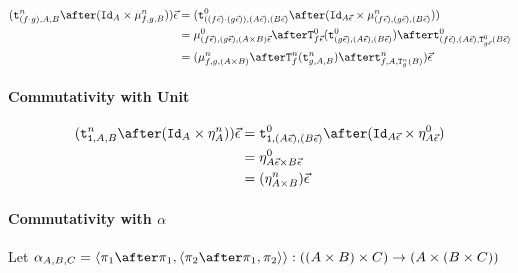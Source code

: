 \documentclass{report}
\begin{document}
\begin{align}
    (\tstrengthn{(f\dot g)}{A}{B}\after (\Id{A}\times \bindn{f}{g}{B}))\ev & = (\tstrengthz{((f\ev)\dot (g\ev))}{(A\ev)}{(B\ev)}\after (\Id{A\ev}\times \bindn{(f\ev)}{(g\ev)}{(B\ev)}))\\
    & = \bindz{(f\ev)}{(g\ev)}{(A\times B)\ev}\after\Tz{f\ev}{(\tstrengthz{(g\ev)}{(A\ev)}{(B\ev)})}\after\tstrengthz{(f\ev)}{(A\ev)}{\Tz{g\ev}{(B\ev)}}\\
    & = (\bindn{f}{g}{(A\times B)}\after\Tn{f}{(\tstrengthn{g}{A}{B})}\after\tstrengthn{f}{A}{\Tn{g}{(B)}})\ev
\end{align}



\paragraph{Commutativity with Unit}


\begin{align}
    (\tstrengthn{\1}{A}{B}\after(\Id{A}\times \pointn{A}))\ev & = \tstrengthz{\1}{(A\ev)}{(B\ev)}\after(\Id{A\ev}\times \pointz{A\ev})\\
    & = \pointz{A\ev\times B\ev}\\
    & = (\pointn{A\times B})\ev
\end{align}

\paragraph{Commutativity with $\alpha$}
Let $\alpha_{A, B, C} = \pr{\p\after\p}{\pr{\pp\after\p}{\pp}}: ((A \times B) \times C) \rightarrow (A \times (B \times C))$


\end{document}
